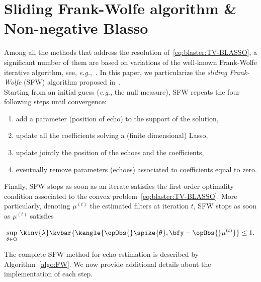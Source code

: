 \chapter{Sliding Frank-Wolfe algorithm \& Non-negative Blasso}\label{ap:blaster}

Among all the methods that address the resolution of~\eqref{eq:blaster:TV-BLASSO}, a significant number of them are based on variations of the well-known Frank-Wolfe iterative algorithm, see, \textit{e.g.},~.
In this paper, we particularize the \emph{sliding Frank-Wolfe} (SFW) algorithm proposed in~.
\\Starting from an initial guess (\textit{e.g.}, the null measure), SFW repeats the four following steps until convergence:
\begin{enumerate}
	\item add a parameter (position of echo) to the support of the solution,
	\item update all the coefficients solving a (finite dimensional) Lasso,
	\item update jointly the position of the echoes  and the coefficients,
	\item eventually remove parameters (echoes) associated to coefficients equal to zero.
\end{enumerate}
Finally, SFW stops as soon as an iterate satisfies the first order optimality condition associated to the convex problem~\eqref{eq:blaster:TV-BLASSO}.
More particularly, denoting $\mu^{(t)}$ the estimated filters at iteration $t$, SFW stops as soon as $\mu^{(t)}$ satisfies~


\begin{equation}
	\label{eq:blasso-dual_certif}
	\sup_{\theta\in\Theta} \,\kinv{\lambda}\kvbar{ \kangle{
		\opObs{}\spike{\theta}, \bfy - \opObs{}\mu^{(t)}
	}}
	\leq 1
	.
\end{equation}


The complete SFW method for echo estimation is described by Algorithm~\ref{algo:FW}.
We now provide additional details about the implementation of each step.

